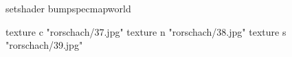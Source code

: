 setshader bumpspecmapworld

    texture c "rorschach/37.jpg"
    texture n "rorschach/38.jpg"
    texture s "rorschach/39.jpg"
